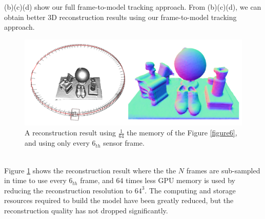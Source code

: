 \documentclass[a4paper,12pt]{article}
\begin{document}
(b)(c)(d) show our full frame-to-model tracking approach. 
From (b)(c)(d), we can obtain better 3D reconstruction results using our frame-to-model tracking approach.
\begin{figure}[h] %
    \centering %
    \includegraphics[scale=0.35]{figure7.png} %
    \caption{A reconstruction result using $\frac{1}{64}$ the memory of the Figure \ref{figure6}, and using only every $6_{th}$ sensor frame\cite{6162880}.} %
    \label{figure7} %
\end{figure}%
\\Figure \ref{figure7} shows the reconstruction result where the the $N$ frames are sub-sampled in time to use every $6_{th}$ frame, and 64 times less GPU memory is used by reducing the reconstruction resolution to $64^3$.
The computing and storage resources required to build the model have been greatly reduced, but the reconstruction quality has not dropped significantly.
\end{document}
